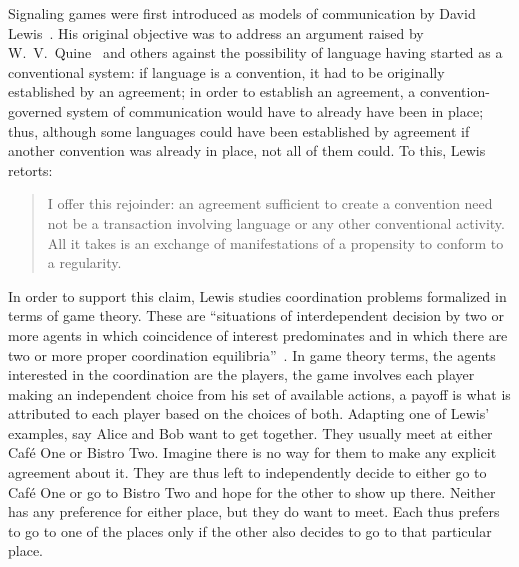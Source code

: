 \documentclass[a4paper]{article}
\begin{document}
Signaling games were first introduced as models of communication by David Lewis~\parencite*{lewis_convention_1969}.
His original objective was to address an argument raised by W.~V.~Quine~\parencite*{quine_truth_1936} and others against the possibility of language having started as a conventional system: if language is a convention, it had to be originally established by an agreement; in order to establish an agreement, a convention-governed system of communication would have to already have been in place; thus, although some languages could have been established by agreement if another convention was already in place, not all of them could.
To this, Lewis retorts:
\begin{quote}
I offer this rejoinder: an agreement sufficient to create a convention need not be a transaction involving language or any other conventional activity.
All it takes is an exchange of manifestations of a propensity to conform to a regularity.%
~\parencite*[87--88]{lewis_convention_1969}
\end{quote}
In order to support this claim, Lewis studies coordination problems formalized in terms of game theory.
These are ``situations of interdependent decision by two or more agents in which coincidence of interest predominates and in which there are two or more proper coordination equilibria''~\parencite*[24]{lewis_convention_1969}.
In game theory terms, the agents interested in the coordination are the players, the game involves each player making an independent choice from his set of available actions, a payoff is what is attributed to each player based on the choices of both.
Adapting one of Lewis' examples, say Alice and Bob want to get together.
They usually meet at either Caf\'e One or Bistro Two.
Imagine there is no way for them to make any explicit agreement about it.
They are thus left to independently decide to either go to Caf\'e One or go to Bistro Two and hope for the other to show up there.
Neither has any preference for either place, but they do want to meet.
Each thus prefers to go to one of the places only if the other also decides to go to that particular place.
\end{document}
